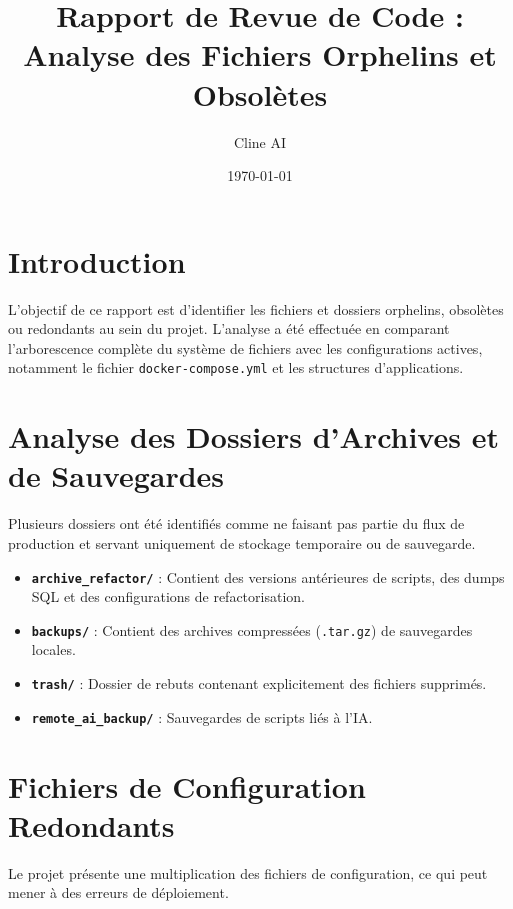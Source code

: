 \documentclass[a4paper,12pt]{article}
\title{Rapport de Revue de Code : Analyse des Fichiers Orphelins et Obsolètes}
\author{Cline AI}
\date{\today}
\begin{document}
\maketitle

\section{Introduction}
L'objectif de ce rapport est d'identifier les fichiers et dossiers orphelins, obsolètes ou redondants au sein du projet. L'analyse a été effectuée en comparant l'arborescence complète du système de fichiers avec les configurations actives, notamment le fichier \texttt{docker-compose.yml} et les structures d'applications.

\section{Analyse des Dossiers d'Archives et de Sauvegardes}
Plusieurs dossiers ont été identifiés comme ne faisant pas partie du flux de production et servant uniquement de stockage temporaire ou de sauvegarde.

\begin{itemize}
    \item \textbf{\texttt{archive\_refactor/}} : Contient des versions antérieures de scripts, des dumps SQL et des configurations de refactorisation.
    \item \textbf{\texttt{backups/}} : Contient des archives compressées (\texttt{.tar.gz}) de sauvegardes locales.
    \item \textbf{\texttt{trash/}} : Dossier de rebuts contenant explicitement des fichiers supprimés.
    \item \textbf{\texttt{remote\_ai\_backup/}} : Sauvegardes de scripts liés à l'IA.
\end{itemize}

\section{Fichiers de Configuration Redondants}
Le projet présente une multiplication des fichiers de configuration, ce qui peut mener à des erreurs de déploiement.
\end{document}
